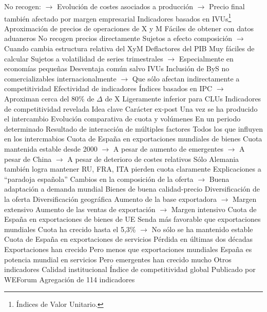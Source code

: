 \documentclass{nuevotema}
\begin{document}
\begin{esquemal}
				\4[] No recogen:
				\4[] $\to$ Evolución de costes asociados a producción
				\4[] $\to$ Precio final también afectado por margen empresarial
				\4 Indicadores basados en IVUs\footnote{Índices de Valor Unitario.}
				\4[] Aproximación de precios de operaciones de X y M
				\4[] Fáciles de obtener con datos aduaneros
				\4[] No recogen precios directamente
				\4[] Sujetos a efecto composición
				\4[] $\to$ Cuando cambia estructura relativa del XyM
				\4 Deflactores del PIB
				\4[] Muy fáciles de calcular
				\4[] Sujetos a volatilidad de series trimestrales
				\4[] $\to$ Especialmente en economías pequeñas
				\4 Desventaja común salvo IVUs
				\4[] Inclusión de ByS no comercializables internacionalmente
				\4[] $\to$ Que sólo afectan indirectamente a competitividad
				\4 Efectividad de indicadores
				\4[] Índices basados en IPC
				\4[] $\to$ Aproximan cerca del 80\% de $\Delta$ de X
				\4[] Ligeramente inferior para CLUs
		\2 Indicadores de competitividad revelada
			\3 Idea clave
				\4 Carácter ex-post
				\4[] Una vez se ha producido el intercambio
				\4 Evolución comparativa de cuota y volúmenes
				\4[] En un periodo determinado
				\4 Resultado de interacción de múltiples factores
				\4[] Todos los que influyen en los intercmabios
			\3 Cuota de España en exportaciones mundiales de bienes
				\4 Cuota mantenida estable desde 2000
				\4[] $\to$ A pesar de aumento de emergentes
				\4[] $\to$ A pesar de China
				\4[] $\to$ A pesar de deterioro de costes relativos
				\4 Sólo Alemania también logra mantener
				\4[] RU, FRA, ITA pierden cuota claramente
				\4 Explicaciones a ``paradoja española''
				\4[] Cambios en la composición de la oferta
				\4[] $\to$ Buena adaptación a demanda mundial
				\4[] Bienes de buena calidad-precio
				\4[] Diversificación de la oferta
				\4[] Diversificación geográfica
				\4[] Aumento de la base exportadora
				\4[] $\to$ Margen extensivo
				\4[] Aumento de las ventas de exportación
				\4[] $\to$ Margen intensivo
			\3 Cuota de España en exportaciones de bienes de UE
				\4 Senda más favorable que exportaciones mundiales
				\4[] Cuota ha crecido hasta el 5,3\%
				\4[] $\to$ No sólo se ha mantenido estable
			\3 Cuota de España en exportaciones de servicios
				\4 Pérdida en últimas dos décadas
				\4 Exportaciones han crecido
				\4[] Pero menos que exportaciones mundiales
				\4 España es potencia mundial en servicios
				\4[] Pero emergentes han crecido mucho
		\2 Otros indicadores
			\3 Calidad institucional
				\4 Índice de competitividad global
				\4 Publicado por WEForum
				\4 Agregación de 114 indicadores

\end{esquemal}
\end{document}
